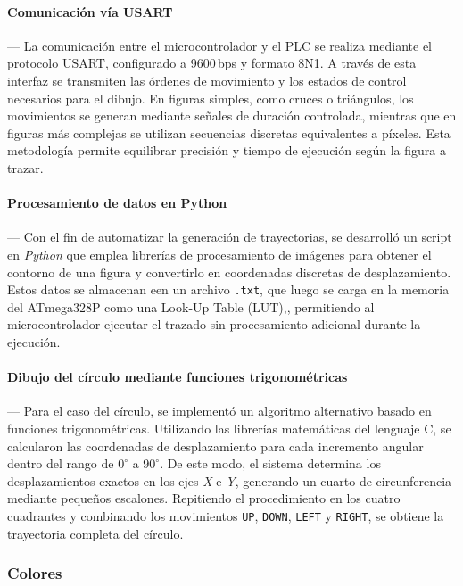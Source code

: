     \paragraph*{\textbf{Comunicación vía USART}}---
    La comunicación entre el microcontrolador y el PLC se realiza mediante el protocolo USART, configurado a 9600\,bps y formato 8N1. A través de esta interfaz se transmiten las órdenes de movimiento y los estados de control necesarios para el dibujo. En figuras simples, como cruces o triángulos, los movimientos se generan mediante señales de duración controlada, mientras que en figuras más complejas se utilizan secuencias discretas equivalentes a píxeles. Esta metodología permite equilibrar precisión y tiempo de ejecución según la figura a trazar.

    \paragraph*{\textbf{Procesamiento de datos en Python}}---
    Con el fin de automatizar la generación de trayectorias, se desarrolló un script en \textit{Python} que emplea librerías de procesamiento de imágenes para obtener el contorno de una figura y convertirlo en coordenadas discretas de desplazamiento. Estos datos se almacenan een un archivo \texttt{.txt}, que luego se carga en la memoria del ATmega328P como una Look-Up Table (LUT),, permitiendo al microcontrolador ejecutar el trazado sin procesamiento adicional durante la ejecución.

    \paragraph*{\textbf{Dibujo del círculo mediante funciones trigonométricas}}---
    Para el caso del círculo, se implementó un algoritmo alternativo basado en funciones trigonométricas. Utilizando las librerías matemáticas del lenguaje C, se calcularon las coordenadas de desplazamiento para cada incremento angular dentro del rango de \(0^\circ\) a \(90^\circ\). De este modo, el sistema determina los desplazamientos exactos en los ejes \textit{X} e \textit{Y}, generando un cuarto de circunferencia mediante pequeños escalones. Repitiendo el procedimiento en los cuatro cuadrantes y combinando los movimientos \texttt{UP}, \texttt{DOWN}, \texttt{LEFT} y \texttt{RIGHT}, se obtiene la trayectoria completa del círculo.


    
\subsubsection{\textbf{Colores}}

